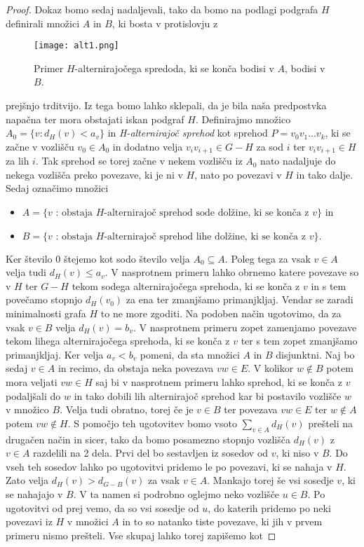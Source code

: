 \documentclass[12pt,a4paper,twoside]{article}
\theoremstyle{definition} %
\theoremstyle{plain} %
\numberwithin{equation}{section}  %
\begin{document}
\begin{proof}
Dokaz bomo sedaj nadaljevali, tako da bomo na podlagi podgrafa $H$ definirali množici $A$ in $B$, ki bosta v protislovju z  \begin{figure}[h!]
\caption{Primer $H$-alternirajočega spredoda, ki se konča bodisi v $A$, bodisi v $B$.}
\label{im1}
\centering
    \texttt{[image: alt1.png]}
    \end{figure}prejšnjo trditvijo. Iz tega bomo lahko sklepali, da je bila naša predpostvka napačna ter mora obstajati iskan podgraf $H$. 
Definirajmo množico $A_0 = \{v : d_H(v) < a_v\}$ in \textit{H-alternirajoč sprehod} kot sprehod $P = v_0v_1\ldots v_k$, ki se začne v vozlišču $v_0 \in A_0$ in dodatno velja $v_iv_{i+1} \in G-H$ za sod $i$ ter $v_iv_{i+1} \in H$ za lih $i$. Tak sprehod se torej začne v nekem vozlišču iz $A_0$ nato nadaljuje do nekega vozlišča preko povezave, ki je ni v $H$, nato po povezavi v $H$ in tako dalje. Sedaj označimo množici
\begin{itemize}
\item $A = \{v \text{ : obstaja $H$-alternirajoč sprehod sode dolžine, ki se konča z $v$}\}$ in
\item $B =\{v \text{ : obstaja $H$-alternirajoč sprehod lihe dolžine, ki se konča z $v$}\}.$
\end{itemize}
Ker število $0$ štejemo kot sodo število velja $A_0 \subseteq A$. Poleg tega za vsak $v \in A$ velja tudi $d_H(v) \le a_v$. V nasprotnem primeru lahko obrnemo katere povezave so v $H$ ter $G-H$ tekom sodega alternirajočega sprehoda, ki se konča z $v$ in s tem povečamo stopnjo $d_H(v_0)$ za ena ter zmanjšamo primanjkljaj. Vendar se zaradi minimalnosti grafa $H$ to ne more zgoditi. Na podoben način ugotovimo, da za vsak $v \in B$ velja $d_H(v) = b_v$. V nasprotnem primeru zopet zamenjamo povezave tekom lihega alternirajočega sprehoda, ki se konča z $v$ ter s tem zopet zmanjšamo primanjkljaj. Ker velja $a_v < b_v$ pomeni, da sta množici $A$ in $B$ disjunktni. Naj bo sedaj $v \in A$ in recimo, da obstaja neka povezava $vw \in E$. V kolikor $w \notin B$ potem mora veljati $vw \in H$ saj bi v nasprotnem primeru lahko sprehod, ki se konča z $v$ podaljšali do $w$ in tako dobili lih alternirajoč sprehod kar bi postavilo vozlišče $w$ v množico $B$. Velja tudi obratno, torej če je $v \in B$ ter povezava $vw \in  E$ ter $w \notin A$ potem $vw \notin H$. S pomočjo teh ugotovitev bomo vsoto $\sum_{v \in A} d_H(v)$ prešteli na drugačen način in sicer, tako da bomo posamezno stopnjo vozlišča $d_H(v)$ z $v \in  A$ razdelili na 2 dela. Prvi del bo sestavljen iz sosedov od $v$, ki niso v $B$. Do vseh teh sosedov lahko po ugotovitvi pridemo le po povezavi, ki se nahaja v $H$. Zato velja $d_H(v) > d_{G-B}(v)$ za vsak $v \in A$. Mankajo torej še vsi sosedje $v$, ki se nahajajo v $B$. V ta namen si podrobno oglejmo neko vozlišče $u \in B$. Po ugotovitvi od prej vemo, da so vsi sosedje od $u$, do katerih pridemo po neki povezavi iz $H$ v množici $A$ in to so natanko tiste povezave, ki jih v prvem primeru nismo prešteli. Vse skupaj lahko torej zapišemo kot

\end{proof}
\end{document}
